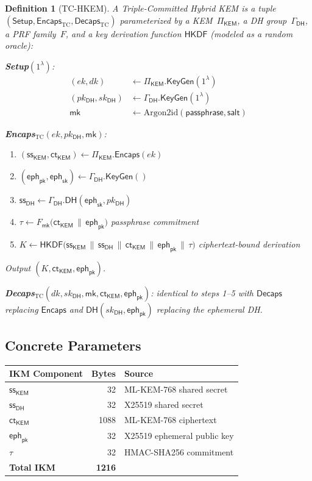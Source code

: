 \documentclass[11pt,a4paper]{article}
\newtheorem{definition}[theorem]{Definition}
\newcommand{\KEM}{\mathsf{KEM}}
\renewcommand{\DH}{\mathsf{DH}}
\newcommand{\HKDF}{\mathsf{HKDF}}
\newcommand{\Encaps}{\mathsf{Encaps}}
\newcommand{\Decaps}{\mathsf{Decaps}}
\newcommand{\KeyGen}{\mathsf{KeyGen}}
\newcommand{\mk}{\mathsf{mk}}
\newcommand{\ct}{\mathsf{ct}}
\newcommand{\eph}{\mathsf{eph}}
\newcommand{\salt}{\mathsf{salt}}
\begin{document}
\begin{definition}[TC-HKEM]\label{def:tchkem}
A \emph{Triple-Committed Hybrid KEM} is a tuple
$(\mathsf{Setup}, \Encaps_{\mathrm{TC}}, \Decaps_{\mathrm{TC}})$ parameterized by a
KEM~$\Pi_{\KEM}$, a DH group~$\Gamma_{\DH}$, a PRF family~$F$,
and a key derivation function $\HKDF$ (modeled as a random oracle):

\medskip\noindent\textbf{Setup}$(1^\lambda)$:
\begin{align}
(ek, dk) &\leftarrow \Pi_{\KEM}.\KeyGen(1^\lambda) \\
(pk_{\DH}, sk_{\DH}) &\leftarrow \Gamma_{\DH}.\KeyGen(1^\lambda) \\
\mk &\leftarrow \mathrm{Argon2id}(\mathsf{passphrase}, \salt)
\end{align}

\medskip\noindent\textbf{Encaps}$_{\mathrm{TC}}(ek, pk_{\DH}, \mk)$:
\begin{enumerate}[nosep]
\item $(\mathsf{ss}_{\KEM}, \ct_{\KEM}) \leftarrow \Pi_{\KEM}.\Encaps(ek)$
\item $(\eph_{\mathsf{pk}}, \eph_{\mathsf{sk}}) \leftarrow \Gamma_{\DH}.\KeyGen()$
\item $\mathsf{ss}_{\DH} \leftarrow \Gamma_{\DH}.\DH(\eph_{\mathsf{sk}}, pk_{\DH})$
\item $\tau \leftarrow F_{\mk}\bigl(\ct_{\KEM} \,\|\, \eph_{\mathsf{pk}}\bigr)$
\hfill{\color{commitcolor}\emph{passphrase commitment}}
\item $K \leftarrow \HKDF\bigl(\mathsf{ss}_{\KEM} \,\|\, \mathsf{ss}_{\DH} \,\|\, \ct_{\KEM} \,\|\, \eph_{\mathsf{pk}} \,\|\, \tau\bigr)$
\hfill{\color{hkdfcolor}\emph{ciphertext-bound derivation}}
\end{enumerate}
Output $(K, \ct_{\KEM}, \eph_{\mathsf{pk}})$.

\medskip\noindent\textbf{Decaps}$_{\mathrm{TC}}(dk, sk_{\DH}, \mk, \ct_{\KEM}, \eph_{\mathsf{pk}})$:
identical to steps 1--5 with $\Decaps$ replacing $\Encaps$ and
$\DH(sk_{\DH}, \eph_{\mathsf{pk}})$ replacing the ephemeral DH.
\end{definition}

\subsection{Concrete Parameters}

\begin{center}
\begin{tabular}{lrl}
\toprule
\textbf{IKM Component} & \textbf{Bytes} & \textbf{Source} \\
\midrule
$\mathsf{ss}_{\KEM}$ & 32 & ML-KEM-768 shared secret \\
$\mathsf{ss}_{\DH}$ & 32 & X25519 shared secret \\
$\ct_{\KEM}$ & 1088 & ML-KEM-768 ciphertext \\
$\eph_{\mathsf{pk}}$ & 32 & X25519 ephemeral public key \\
$\tau$ & 32 & HMAC-SHA256 commitment \\
\midrule
\textbf{Total IKM} & \textbf{1216} & \\
\bottomrule
\end{tabular}
\end{center}
\end{document}
